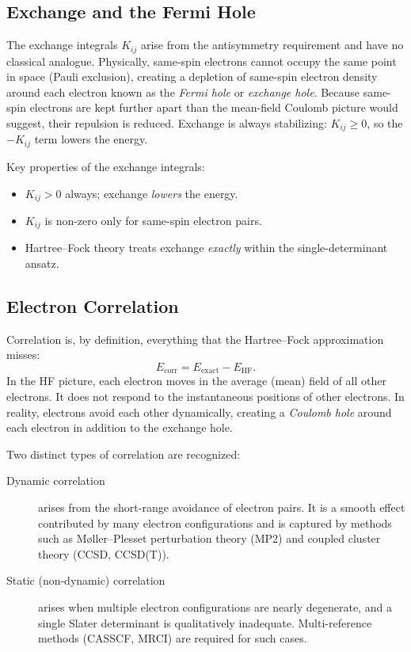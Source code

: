 \documentclass[11pt]{article}
\numberwithin{equation}{section}
\begin{document}
\subsection{Exchange and the Fermi Hole}

The exchange integrals $K_{ij}$ arise from the antisymmetry requirement and have no classical analogue. Physically, same-spin electrons cannot occupy the same point in space (Pauli exclusion), creating a depletion of same-spin electron density around each electron known as the \emph{Fermi hole} or \emph{exchange hole}. Because same-spin electrons are kept further apart than the mean-field Coulomb picture would suggest, their repulsion is reduced. Exchange is always stabilizing: $K_{ij} \geq 0$, so the $-K_{ij}$ term lowers the energy.

Key properties of the exchange integrals:
\begin{itemize}
\item $K_{ij} > 0$ always; exchange \emph{lowers} the energy.
\item $K_{ij}$ is non-zero only for same-spin electron pairs.
\item Hartree--Fock theory treats exchange \emph{exactly} within the single-determinant ansatz.
\end{itemize}

\subsection{Electron Correlation}
\label{sec:correlation}

Correlation is, by definition, everything that the Hartree--Fock approximation misses:
\begin{equation}
E_\text{corr} = E_\text{exact} - E_\text{HF}.
\end{equation}
In the HF picture, each electron moves in the average (mean) field of all other electrons. It does not respond to the instantaneous positions of other electrons. In reality, electrons avoid each other dynamically, creating a \emph{Coulomb hole} around each electron in addition to the exchange hole.

Two distinct types of correlation are recognized:
\begin{description}
\item[Dynamic correlation] arises from the short-range avoidance of electron pairs. It is a smooth effect contributed by many electron configurations and is captured by methods such as M\o ller--Plesset perturbation theory (MP2) and coupled cluster theory (CCSD, CCSD(T)).
\item[Static (non-dynamic) correlation] arises when multiple electron configurations are nearly degenerate, and a single Slater determinant is qualitatively inadequate. Multi-reference methods (CASSCF, MRCI) are required for such cases.
\end{description}
\end{document}
